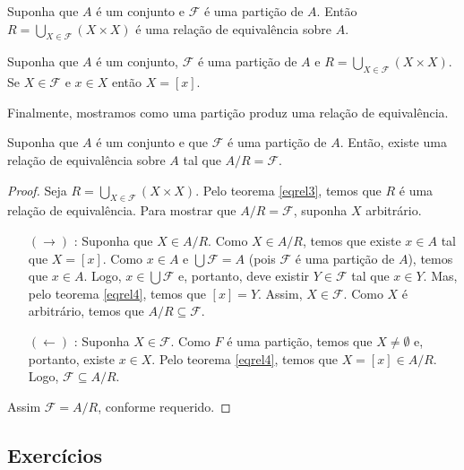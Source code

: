 \begin{Theorem}\label{eqrel3}
Suponha que $A$ é um conjunto e $\mathcal{F}$ é uma partição de
$A$. Então $R = \bigcup_{X \in \mathcal{F}}(X \times X)$ é uma relação
de equivalência sobre $A$.
\end{Theorem}

\begin{Theorem}\label{eqrel4}
Suponha que $A$ é um conjunto, $\mathcal{F}$ é uma partição de
$A$ e $R = \bigcup_{X \in \mathcal{F}}(X \times X)$. Se $X
\in\mathcal{F}$ e $x \in X$ então $X = [x]$.
\end{Theorem}

Finalmente, mostramos como uma partição produz uma relação de equivalência.

\begin{Theorem}
Suponha que $A$ é um conjunto e que $\mathcal{F}$ é uma partição de
$A$. Então, existe uma relação de equivalência sobre $A$ tal que $A /
R = \mathcal{F}$.
\end{Theorem}
\begin{proof}
Seja $R = \bigcup_{X \in \mathcal{F}}(X \times X)$. Pelo teorema
\ref{eqrel3}, temos que $R$ é uma relação de equivalência.
Para mostrar que $A / R = \mathcal{F}$, suponha $X$ arbitrário.
\begin{enumerate}
  \item[$(\to)$]: Suponha que  $X \in A / R$. Como $X \in A /R$, temos que existe $x \in A$ tal que
$X = [x]$. Como $x \in A$ e $\bigcup \mathcal{F} = A$ (pois
$\mathcal{F}$ é uma partição de $A$), temos que $x \in A$. Logo, $x
\in \bigcup\mathcal{F}$ e, portanto, deve existir $Y \in \mathcal{F}$
tal que $x \in Y$. Mas, pelo teorema \ref{eqrel4}, temos que $[x] =
Y$. Assim, $X \in \mathcal{F}$. Como $X$ é arbitrário, temos que $A /
R \subseteq \mathcal{F}$.
   \item[$(\leftarrow)$]: Suponha $X \in \mathcal{F}$. Como $F$ é uma
     partição, temos que $X \neq \emptyset$ e, portanto, existe $x \in
     X$. Pelo teorema \ref{eqrel4}, temos que $X = [x] \in A /
     R$. Logo, $\mathcal{F}\subseteq A / R$.
\end{enumerate}
Assim $\mathcal{F} = A / R$, conforme requerido.
\end{proof}


\subsection{Exercícios}

